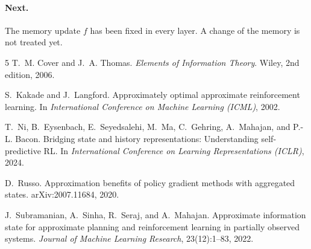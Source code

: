\documentclass{article}
\theoremstyle{definition}
\numberwithin{equation}{section}
\begin{document}
\paragraph{Next.} The memory update $f$ has been fixed in every layer. A change of the memory is not treated yet.

\begin{thebibliography}{5}
T.~M. Cover and J.~A. Thomas.
\newblock \emph{Elements of Information Theory}.
\newblock Wiley, 2nd edition, 2006.

S.~Kakade and J.~Langford.
\newblock Approximately optimal approximate reinforcement learning.
\newblock In \emph{International Conference on Machine Learning (ICML)}, 2002.

T.~Ni, B.~Eysenbach, E.~Seyedsalehi, M.~Ma, C.~Gehring, A.~Mahajan, and P.-L. Bacon.
\newblock Bridging state and history representations: Understanding self-predictive RL.
\newblock In \emph{International Conference on Learning Representations (ICLR)}, 2024.

D.~Russo.
\newblock Approximation benefits of policy gradient methods with aggregated states.
\newblock arXiv:2007.11684, 2020.

J.~Subramanian, A.~Sinha, R.~Seraj, and A.~Mahajan.
\newblock Approximate information state for approximate planning and reinforcement learning in partially observed systems.
\newblock \emph{Journal of Machine Learning Research}, 23(12):1--83, 2022.
\end{thebibliography}
\end{document}
